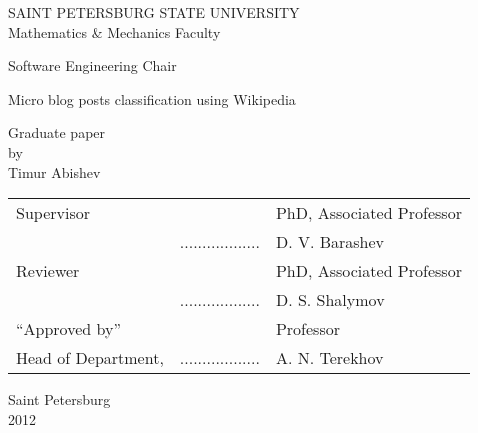 \documentclass[specialist,subf,href,colorlinks=true
]{disser}
\begin{document}
\thispagestyle{empty}
\begin{center}
SAINT PETERSBURG STATE UNIVERSITY\\
Mathematics & Mechanics Faculty\\
\end{center}
\begin{center}
Software Engineering Chair\\
\end{center}
\vspace{2cm}
\begin{center}
    \Large{Micro blog posts classification using Wikipedia} \\
\end{center}
\begin{center}
    \large{Graduate paper} \\
    \normalsize{by} \\
    \large{Timur Abishev}
\end{center}
\vspace{3cm}
\noindent
\begin{center}
    \small
    \begin{tabular}{lcl}
        Supervisor & \dotuline{\phantom{кошерная подпись}} & PhD, Associated Professor\\
        & .................. & D. V. Barashev\\
        Reviewer & \dotuline{\phantom{кошерная подпись}} & PhD, Associated Professor\\
        & .................. & D. S. Shalymov\\
        ``Approved by'' & \dotuline{\phantom{кошерная подпись}} & Professor \\
        Head of Department, & .................. &  A. N. Terekhov\\
    \end{tabular}
\end{center}
\vspace{\fill}
\begin{center}
    \small
    Saint Petersburg\\2012
\end{center}
\pagebreak


\tableofcontents













\end{document}
